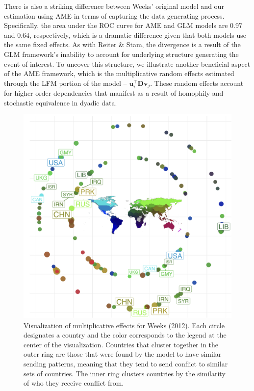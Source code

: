 There is also a striking difference between Weeks' original model and our estimation using AME in terms of capturing the data generating process. Specifically, the area under the ROC curve for AME and GLM models are 0.97 and 0.64, respectively, which is a dramatic difference given that both models use the same fixed effects. As with Reiter \& Stam, the divergence is a result of the GLM framework's inability to account for underlying structure generating the event of interest. To uncover this structure, we illustrate another beneficial aspect of the AME framework, which is the multiplicative random effects estimated through the LFM portion of the model -- $\mathbf{u}_{i}^{\top} \mathbf{D} \mathbf{v}_{j}$. These random effects account for higher order dependencies that manifest as a result of homophily and stochastic equivalence in dyadic data. 

\begin{figure}[!h]
	\includegraphics[width=\textwidth]{graphics/weeks_circPlot.png}
	\caption{ Visualization of multiplicative effects for Weeks (2012). Each circle designates a country and the color corresponds to the legend at the center of the visualization. Countries that cluster together in the outer ring are those that were found by the model to have similar sending patterns, meaning that they tend to send conflict to similar sets of countries. The inner ring clusters countries by the similarity of who they receive conflict from. 
	}
	\label{fig:weekscirc}
\end{figure}
\FloatBarrier

